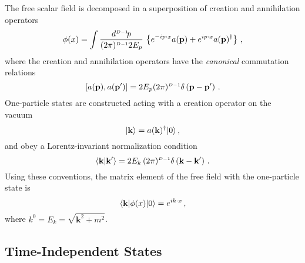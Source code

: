 The free scalar field is decomposed in a superposition of creation and annihilation 
operators
\begin{equation}
    \label{eq:FreeScalModeDecomp}
    \phi(x) = 
    \int \frac{d^{\scriptscriptstyle{D-1}} \!p}{(2\pi)^{\scriptscriptstyle{D-1}} 2E_p}\,
    \left\{
        e^{-ip\cdot x} a(\mathbf{p}) + e^{ip\cdot x} a(\mathbf{p})^\dagger
    \right\}\, ,    
\end{equation}
where the creation and annihilation operators have the {\em canonical} commutation 
relations
\begin{equation}
    \label{eq:CreatAnnihilComm}
    \left[a(\mathbf{p}), a(\mathbf{p}')\right] 
    = 2 E_p (2\pi)^{\scriptscriptstyle{D-1}} \delta\left(\mathbf{p}-\mathbf{p}'\right)\, .
\end{equation}
One-particle states are constructed acting with a creation operator on the vacuum
\begin{equation}
    \label{eq:OnePartCreation}
    | \mathbf{k} \rangle = 
    a(\mathbf{k})^\dagger | 0 \rangle\, ,
\end{equation}
and obey a Lorentz-invariant normalization condition
\begin{equation}
    \label{eq:OnePartLorentzNorm}
    \langle \mathbf{k} | \mathbf{k}' \rangle = 
    2E_k \, (2\pi)^{\scriptscriptstyle{D-1}} \delta\left(\mathbf{k}-\mathbf{k}'\right) \, .
\end{equation}
Using these conventions, the matrix element of the free field with the one-particle state is 
\begin{equation}
    \label{eq:FreeOnePartME}
    \langle \mathbf{k} | \phi(x) | 0 \rangle = e^{ik\cdot x}\, ,
\end{equation}
where $k^0=E_k=\sqrt{\mathbf{k}^2 + m^2}$.

\subsection{Time-Independent States}
\label{sec:TimeIndepStates}

